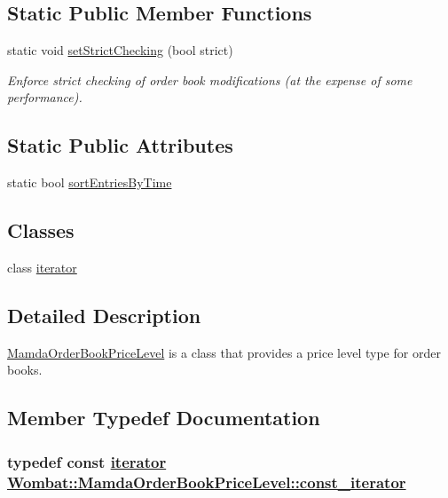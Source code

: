 \subsection*{Static Public Member Functions}
\begin{CompactItemize}
\item 
static void \hyperlink{classWombat_1_1MamdaOrderBookPriceLevel_e9aab3efc4718c4735251417e35ef167}{set\-Strict\-Checking} (bool strict)
\begin{CompactList}\small\item\em Enforce strict checking of order book modifications (at the expense of some performance). \item\end{CompactList}\end{CompactItemize}
\subsection*{Static Public Attributes}
\begin{CompactItemize}
\item 
static bool \hyperlink{classWombat_1_1MamdaOrderBookPriceLevel_320d6fa10c3fce860299af5e77cefe44}{sort\-Entries\-By\-Time}
\end{CompactItemize}
\subsection*{Classes}
\begin{CompactItemize}
\item 
class \hyperlink{classWombat_1_1MamdaOrderBookPriceLevel_1_1iterator}{iterator}
\end{CompactItemize}


\subsection{Detailed Description}
\hyperlink{classWombat_1_1MamdaOrderBookPriceLevel}{Mamda\-Order\-Book\-Price\-Level} is a class that provides a price level type for order books. 



\subsection{Member Typedef Documentation}
\hypertarget{classWombat_1_1MamdaOrderBookPriceLevel_21b49530b6966927c9f5e84b184834a0}{
\subsubsection[const\_\-iterator]{\setlength{\rightskip}{0pt plus 5cm}typedef const \hyperlink{classWombat_1_1MamdaOrderBookPriceLevel_1_1iterator}{iterator} \hyperlink{classWombat_1_1MamdaOrderBookPriceLevel_1_1iterator}{Wombat::Mamda\-Order\-Book\-Price\-Level::const\_\-iterator}}}
\label{classWombat_1_1MamdaOrderBookPriceLevel_21b49530b6966927c9f5e84b184834a0}




